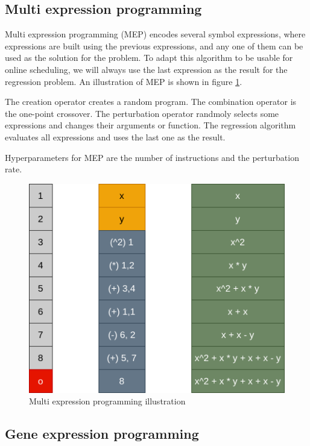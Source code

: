\subsection{Multi expression programming}

Multi expression programming (MEP) \citep{mep} encodes several symbol expressions, where expressions are built using the previous expressions, and any one of them can be used as the solution for the problem. To adapt this algorithm to be usable for online scheduling, we will always use the last expression as the result for the regression problem. An illustration of MEP is shown in figure \ref{fig:mep}.

The creation operator creates a random program. The combination operator is the one-point crossover. The perturbation operator randmoly selects some expressions and changes their arguments or function. The regression algorithm evaluates all expressions and uses the last one as the result.

Hyperparameters for MEP are the number of instructions and the perturbation rate.

\begin{figure}[!htbp]
	\centering
	\includegraphics[scale=0.3]{../images/mep.png}
	\caption{Multi expression programming illustration}
    \label{fig:mep}
\end{figure}

\subsection{Gene expression programming}

